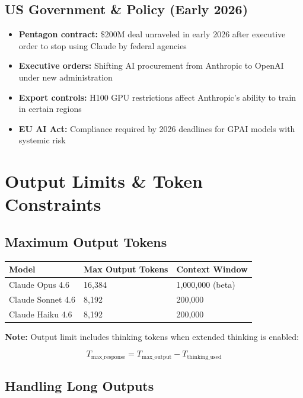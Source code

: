 \documentclass[11pt,a4paper]{article}
\begin{document}
\subsection{US Government \& Policy (Early 2026)}

\begin{itemize}[itemsep=1pt]
  \item \textbf{Pentagon contract:} \$200M deal unraveled in early 2026 after executive order to stop using Claude by federal agencies
  \item \textbf{Executive orders:} Shifting AI procurement from Anthropic to OpenAI under new administration
  \item \textbf{Export controls:} H100 GPU restrictions affect Anthropic's ability to train in certain regions
  \item \textbf{EU AI Act:} Compliance required by 2026 deadlines for GPAI models with systemic risk
\end{itemize}

\section{Output Limits \& Token Constraints}

\subsection{Maximum Output Tokens}

\begin{center}
\begin{tabular}{lll}
\toprule
\textbf{Model} & \textbf{Max Output Tokens} & \textbf{Context Window} \\
\midrule
Claude Opus 4.6 & 16,384 & 1,000,000 (beta) \\
Claude Sonnet 4.6 & 8,192 & 200,000 \\
Claude Haiku 4.6 & 8,192 & 200,000 \\
\bottomrule
\end{tabular}
\end{center}

\textbf{Note:} Output limit includes thinking tokens when extended thinking is enabled:

$$T_{\text{max\_response}} = T_{\text{max\_output}} - T_{\text{thinking\_used}}$$

\subsection{Handling Long Outputs}
\end{document}
